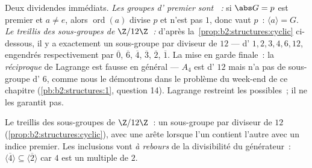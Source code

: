 \begin{example}\label{ex:b2:structures:lagrangeapp}
Deux dividendes immédiats. \emph{Les groupes d' premier sont
~:} si $\abs G = p$ est premier et $a \neq e$, alors
$\operatorname{ord}(a)$ divise $p$ et n'est pas $1$, donc vaut $p$~:
$\langle a\rangle = G$. \emph{Le treillis des sous-groupes de
$\Z/12\Z$~:} d'après la~\cref{prop:b2:structures:cyclic} ci-dessous,
il y a exactement un sous-groupe par diviseur de $12$ --- d'
$1, 2, 3, 4, 6, 12$, engendrés respectivement par $\overline 0$,
$\overline 6$, $\overline 4$, $\overline 3$, $\overline 2$,
$\overline 1$. La mise en garde finale~: la \emph{réciproque} de
Lagrange est fausse en général --- $A_4$ est d' $12$ mais n'a
pas de sous-groupe d' $6$, comme nous le démontrons dans le
problème du week-end de ce chapitre (\cref{pb:b2:structures:1},
question 14). Lagrange restreint les  possibles~; il ne les
garantit pas.
\end{example}

\begin{omfigure}

{\small Le treillis des sous-groupes de $\Z/12\Z$~: un sous-groupe
par diviseur de $12$ (\cref{prop:b2:structures:cyclic}), avec une
arête lorsque l'un contient l'autre avec un indice premier. Les
inclusions vont \emph{à rebours} de la divisibilité du générateur~:
$\langle\overline 4\rangle \subseteq \langle\overline2\rangle$ car
$4$ est un multiple de $2$.}
\end{omfigure}

